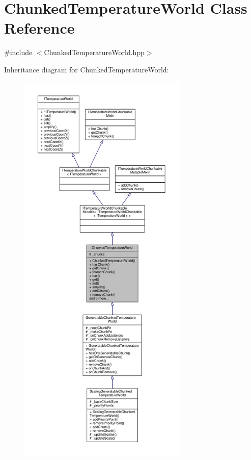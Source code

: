 \hypertarget{class_chunked_temperature_world}{\section{Chunked\-Temperature\-World Class Reference}
\label{class_chunked_temperature_world}
}


{\ttfamily \#include $<$Chunked\-Temperature\-World.\-hpp$>$}



Inheritance diagram for Chunked\-Temperature\-World\-:
\nopagebreak
\begin{figure}[H]
\begin{center}
\leavevmode
\includegraphics[height=550pt]{class_chunked_temperature_world__inherit__graph}
\end{center}
\end{figure}


